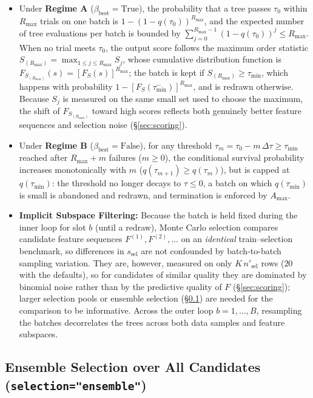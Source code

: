 \documentclass[11pt,a4paper]{article}
\newcommand{\code}[1]{\texttt{#1}}
\begin{document}
\begin{itemize}[leftmargin=*, itemsep=4pt]
  \item Under \textbf{Regime A} ($\beta_{\text{best}} = \text{True}$), the probability that a tree passes $\tau_0$ within $R_{\max}$ trials on one batch is $1 - (1 - q(\tau_0))^{R_{\max}}$, and the expected number of tree evaluations per batch is bounded by $\sum_{j=0}^{R_{\max}-1} (1 - q(\tau_0))^j \le R_{\max}$. When no trial meets $\tau_0$, the output score follows the maximum order statistic $S_{(R_{\max})} = \max_{1 \le j \le R_{\max}} S_j$, whose cumulative distribution function is $F_{S_{(R_{\max})}}(s) = [F_S(s)]^{R_{\max}}$; the batch is kept if $S_{(R_{\max})} \ge \tau_{\min}$, which happens with probability $1 - [F_S(\tau_{\min}^-)]^{R_{\max}}$, and is redrawn otherwise. Because $S_j$ is measured on the same small set used to choose the maximum, the shift of $F_{S_{(R_{\max})}}$ toward high scores reflects both genuinely better feature sequences and selection noise (\S\ref{sec:scoring}).
  \item Under \textbf{Regime B} ($\beta_{\text{best}} = \text{False}$), for any threshold $\tau_m = \tau_0 - m\,\Delta\tau \ge \tau_{\min}$ reached after $R_{\max} + m$ failures ($m \ge 0$), the conditional survival probability increases monotonically with $m$ ($q(\tau_{m+1}) \ge q(\tau_m)$), but is capped at $q(\tau_{\min})$: the threshold no longer decays to $\tau \le 0$, a batch on which $q(\tau_{\min})$ is small is abandoned and redrawn, and termination is enforced by $A_{\max}$.
  \item \textbf{Implicit Subspace Filtering:} Because the batch is held fixed during the inner loop for slot $b$ (until a redraw), Monte Carlo selection compares candidate feature sequences $F^{(1)}, F^{(2)}, \dots$ on an \emph{identical} train--selection benchmark, so differences in $s_{\text{sel}}$ are not confounded by batch-to-batch sampling variation. They are, however, measured on only $K\, n'_{\text{sel}}$ rows ($20$ with the defaults), so for candidates of similar quality they are dominated by binomial noise rather than by the predictive quality of $F$ (\S\ref{sec:scoring}); larger selection pools or ensemble selection (\S\ref{sec:ensemble_sel}) are needed for the comparison to be informative. Across the outer loop $b = 1, \dots, B$, resampling the batches decorrelates the trees across both data samples and feature subspaces.
\end{itemize}

\subsection{Ensemble Selection over All Candidates (\texorpdfstring{\code{selection="ensemble"}}{selection="ensemble"})}
\label{sec:ensemble_sel}
\end{document}
